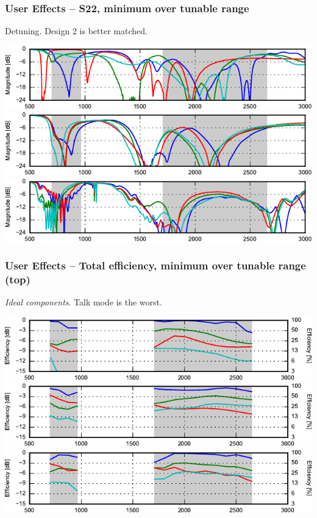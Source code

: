 \begin{frame}
    \frametitle{User Effects -- S22, minimum over tunable range}
    Detuning. Design 2 is better matched.
    \begin{center}
        \includegraphics{img/soren/ue/design1lt/s22side.pdf}\\
        \includegraphics{img/soren/ue/design2sn/s22side.pdf}\\
        \includegraphics{img/soren/ue/design3hv/s22side.pdf}
    \end{center}
    \legendfooter
\end{frame}

\begin{frame}
    \frametitle{User Effects -- Total efficiency, minimum over tunable range (top)}
    \textit{Ideal components}. Talk mode is the worst.
    \begin{center}
        \includegraphics{img/soren/ue/design1lt/efftop.pdf}\\
        \includegraphics{img/soren/ue/design2sn/efftop.pdf}\\
        \includegraphics{img/soren/ue/design3hv/efftop.pdf}
    \end{center}
    \legendfooter
\end{frame}

